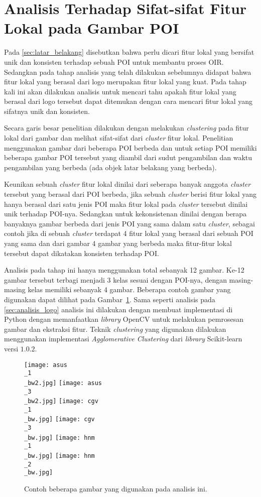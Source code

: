 \section{Analisis Terhadap Sifat-sifat Fitur Lokal pada Gambar POI}
\label{sec:analisis_sifat}
Pada \ref{sec:latar_belakang} disebutkan bahwa perlu dicari fitur lokal yang bersifat unik dan konsisten terhadap sebuah POI untuk membantu proses OIR. Sedangkan pada tahap analisis yang telah dilakukan sebelumnya didapat bahwa fitur lokal yang berasal dari logo merupakan fitur lokal yang kuat. Pada tahap kali ini akan dilakukan analisis untuk mencari tahu apakah fitur lokal yang berasal dari logo tersebut dapat ditemukan dengan cara mencari fitur lokal yang sifatnya unik dan konsisten.

Secara garis besar penelitian dilakukan dengan melakukan \textit{clustering} pada fitur lokal dari gambar dan melihat sifat-sifat dari \textit{cluster} fitur lokal. Penelitian menggunakan gambar dari beberapa POI berbeda dan untuk setiap POI memiliki beberapa gambar POI tersebut yang diambil dari sudut pengambilan dan waktu pengambilan yang berbeda (ada objek latar belakang yang berbeda). 

Keunikan sebuah \textit{cluster} fitur lokal dinilai dari seberapa banyak anggota \textit{cluster} tersebut yang berasal dari POI berbeda, jika sebuah \textit{cluster} berisi fitur lokal yang hanya berasal dari satu jenis POI maka fitur lokal pada \textit{cluster} tersebut dinilai unik terhadap POI-nya. Sedangkan untuk kekonsistenan dinilai dengan berapa banyaknya gambar berbeda dari jenis POI yang sama dalam satu \textit{cluster}, sebagai contoh jika di sebuah \textit{cluster} terdapat 4 fitur lokal yang berasal dari sebuah POI yang sama dan dari gambar 4 gambar yang berbeda maka fitur-fitur lokal tersebut dapat dikatakan konsisten terhadap POI.

Analisis pada tahap ini hanya menggunakan total sebanyak 12 gambar. Ke-12 gambar tersebut terbagi menjadi 3 kelas sesuai dengan POI-nya, dengan masing-masing kelas memiliki sebanyak 4 gambar. Beberapa contoh gambar yang digunakan dapat dilihat pada Gambar~\ref{fig:contoh_gambar_clustering}. Sama seperti analisis pada \ref{sec:analisis_logo} analisis ini dilakukan dengan membuat implementasi di Python dengan memanfaatkan \textit{library} OpenCV untuk melakukan pemrosesan gambar dan ekstraksi fitur. Teknik \textit{clustering} yang digunakan dilakukan menggunakan implementasi \textit{Agglomerative Clustering} dari \textit{library} Scikit-learn versi $1.0.2$.
\begin{figure}[H]
	\centering
	\texttt{[image: asus\\\_1\\\_bw2.jpg]}
	\texttt{[image: asus\\\_3\\\_bw2.jpg]}
	\texttt{[image: cgv\\\_1\\\_bw.jpg]}
	\texttt{[image: cgv\\\_3\\\_bw.jpg]}
	\texttt{[image: hnm\\\_1\\\_bw.jpg]}
	\texttt{[image: hnm\\\_2\\\_bw.jpg]}
	\caption{Contoh beberapa gambar yang digunakan pada analisis ini.}
	\label{fig:contoh_gambar_clustering}
\end{figure}


